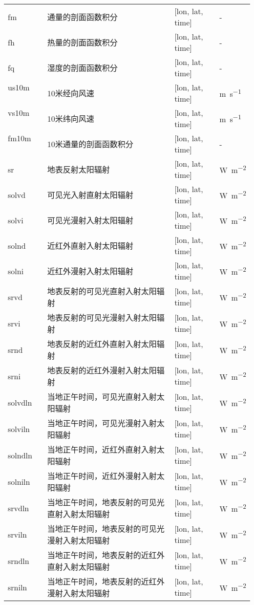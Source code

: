{\begin{longtable}[htbp]{lp{}p{}l}
fm ~ ~ ~ & 通量的剖面函数积分 & {[}lon, lat, time{]}  & - \\
fh ~ ~ ~ & 热量的剖面函数积分 & {[}lon, lat, time{]}  & - \\
fq ~ ~ ~ & 湿度的剖面函数积分 & {[}lon, lat, time{]}  & - \\
us10m~ ~ & 10米经向风速 & {[}lon, lat, time{]}  & \unit{m.s^{-1}} \\
vs10m~ ~ & 10米纬向风速 & {[}lon, lat, time{]}  & \unit{m.s^{-1}} \\
fm10m~ ~ & 10米通量的剖面函数积分 & {[}lon, lat, time{]}  & - \\
sr ~ ~ ~ & 地表反射太阳辐射 & {[}lon, lat, time{]}  & \unit{W.m^{-2}} \\
solvd~ ~ & 可见光入射直射太阳辐射 & {[}lon, lat, time{]}  & \unit{W.m^{-2}} \\
solvi~ ~ & 可见光漫射入射太阳辐射 & {[}lon, lat, time{]}  & \unit{W.m^{-2}} \\
solnd~ ~ & 近红外直射入射太阳辐射 & {[}lon, lat, time{]}  & \unit{W.m^{-2}} \\
solni~ ~ & 近红外漫射入射太阳辐射 & {[}lon, lat, time{]}  & \unit{W.m^{-2}} \\
srvd ~ ~ & 地表反射的可见光直射入射太阳辐射 & {[}lon, lat, time{]}  & \unit{W.m^{-2}} \\
srvi ~ ~ & 地表反射的可见光漫射入射太阳辐射 & {[}lon, lat, time{]}  & \unit{W.m^{-2}} \\
srnd ~ & 地表反射的近红外直射入射太阳辐射 & {[}lon, lat, time{]}  & \unit{W.m^{-2}} \\
srni ~ & 地表反射的近红外漫射入射太阳辐射 & {[}lon, lat, time{]}  & \unit{W.m^{-2}} \\
solvdln~ & 当地正午时间，可见光直射入射太阳辐射 & {[}lon, lat,
time{]}  & \unit{W.m^{-2}} \\
solviln~ & 当地正午时间，可见光漫射入射太阳辐射 & {[}lon, lat,
time{]}  & \unit{W.m^{-2}} \\
solndln~ & 当地正午时间，近红外直射入射太阳辐射 & {[}lon, lat,
time{]}  & \unit{W.m^{-2}} \\
solniln~ & 当地正午时间，近红外漫射入射太阳辐射 & {[}lon, lat,
time{]}  & \unit{W.m^{-2}} \\
srvdln ~ & 当地正午时间，地表反射的可见光直射入射太阳辐射 & {[}lon, lat,
time{]}  & \unit{W.m^{-2}} \\
srviln ~ & 当地正午时间，地表反射的可见光漫射入射太阳辐射 & {[}lon, lat,
time{]}  & \unit{W.m^{-2}} \\
srndln ~ & 当地正午时间，地表反射的近红外直射入射太阳辐射 & {[}lon, lat,
time{]}  & \unit{W.m^{-2}} \\
srniln~ & 当地正午时间，地表反射的近红外漫射入射太阳辐射 & {[}lon, lat,
time{]}  & \unit{W.m^{-2}} \\


\end{longtable}}
